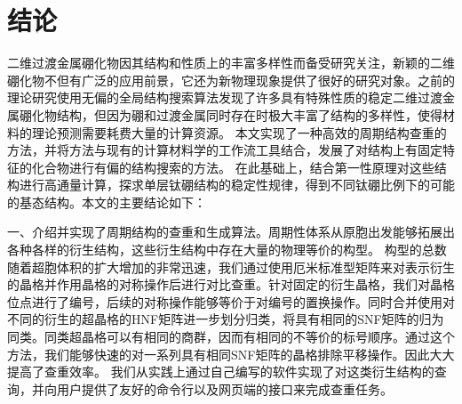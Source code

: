 \documentclass[phd,nobackinfo]{scutthesis}
\begin{document}
\listoffigures

\listoftables

\mainmatter











\chapter{结论}\label{chapter_concludes}

二维过渡金属硼化物因其结构和性质上的丰富多样性而备受研究关注，新颖的二维硼化物不但有广泛的应用前景，它还为新物理现象提供了很好的研究对象。之前的理论研究使用无偏的全局结构搜索算法发现了许多具有特殊性质的稳定二维过渡金属硼化物结构，但因为硼和过渡金属同时存在时极大丰富了结构的多样性，使得材料的理论预测需要耗费大量的计算资源。
本文实现了一种高效的周期结构查重的方法，并将方法与现有的计算材料学的工作流工具结合，发展了对结构上有固定特征的化合物进行有偏的结构搜索的方法。
在此基础上，结合第一性原理对这些结构进行高通量计算，探求单层钛硼结构的稳定性规律，得到不同钛硼比例下的可能的基态结构。本文的主要结论如下：

一、介绍并实现了周期结构的查重和生成算法。周期性体系从原胞出发能够拓展出各种各样的衍生结构，这些衍生结构中存在大量的物理等价的构型。
构型的总数随着超胞体积的扩大增加的非常迅速，我们通过使用厄米标准型矩阵来对表示衍生的晶格并作用晶格的对称操作后进行对比查重。针对固定的衍生晶格，我们对晶格位点进行了编号，后续的对称操作能够等价于对编号的置换操作。同时合并使用对不同的衍生的超晶格的HNF矩阵进一步划分归类，将具有相同的SNF矩阵的归为同类。同类超晶格可以有相同的商群，因而有相同的不等价的标号顺序。通过这个方法，我们能够快速的对一系列具有相同SNF矩阵的晶格排除平移操作。因此大大提高了查重效率。
我们从实践上通过自己编写的软件实现了对这类衍生结构的查询，并向用户提供了友好的命令行以及网页端的接口来完成查重任务。
\end{document}

